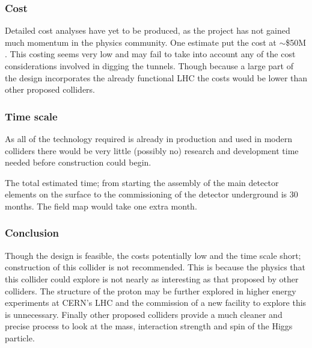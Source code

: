 \subsubsection{Cost}

Detailed cost analyses have yet to be produced, as the project has not gained much momentum in the physics community. One estimate put the cost at $\sim$\$50M \cite{LHeC:Zimmermann}. This costing seems very low and may fail to take into account any of the cost considerations involved in digging the tunnels. Though because a large part of the design incorporates the already functional LHC the costs would be lower than other proposed colliders.
 
 
\subsubsection{Time scale}

As all of the technology required is already in production and used in modern colliders there would be very little (possibly no) research and development time needed before construction could begin.
 
The total estimated time; from starting the assembly of the main detector elements on the surface to the commissioning of the detector underground is 30 months. The field map would take one extra month.
 
\subsubsection{Conclusion}

Though the design is feasible, the costs potentially low and the time scale short; construction of this collider is not recommended. This is because the physics that this collider could explore is not nearly as interesting as that proposed by other colliders. The structure of the proton may be further explored in higher energy experiments at CERN’s LHC and the commission of a new facility to explore this is unnecessary. Finally other proposed colliders provide a much cleaner and precise process to look at the mass, interaction strength and spin of the Higgs particle.